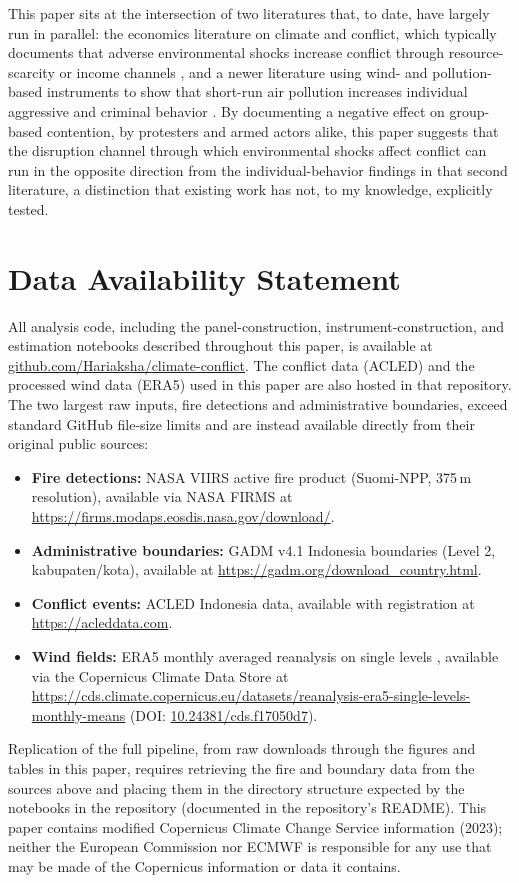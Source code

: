 \documentclass[12pt]{article}
\begin{document}
This paper sits at the intersection of two literatures that, to date, have largely run in parallel: the economics literature on climate and conflict, which typically documents that adverse environmental shocks increase conflict through resource-scarcity or income channels \citep{hsiang2013quantifying,burkehsiangmiguel2015}, and a newer literature using wind- and pollution-based instruments to show that short-run air pollution increases individual aggressive and criminal behavior \citep{herrnstadt2021,bondyrothsager2020,burkhardt2019}. By documenting a negative effect on group-based contention, by protesters and armed actors alike, this paper suggests that the disruption channel through which environmental shocks affect conflict can run in the opposite direction from the individual-behavior findings in that second literature, a distinction that existing work has not, to my knowledge, explicitly tested.

\section*{Data Availability Statement}

All analysis code, including the panel-construction, instrument-construction, and estimation notebooks described throughout this paper, is available at \href{https://github.com/Hariaksha/climate-conflict}{github.com/Hariaksha/climate-conflict}. The conflict data (ACLED) and the processed wind data (ERA5) used in this paper are also hosted in that repository. The two largest raw inputs, fire detections and administrative boundaries, exceed standard GitHub file-size limits and are instead available directly from their original public sources:
\begin{itemize}
    \item \textbf{Fire detections:} NASA VIIRS active fire product (Suomi-NPP, 375\,m resolution), available via NASA FIRMS at \url{https://firms.modaps.eosdis.nasa.gov/download/}.
    \item \textbf{Administrative boundaries:} GADM v4.1 Indonesia boundaries (Level 2, kabupaten/kota), available at \url{https://gadm.org/download_country.html}.
    \item \textbf{Conflict events:} ACLED Indonesia data, available with registration at \url{https://acleddata.com}.
    \item \textbf{Wind fields:} ERA5 monthly averaged reanalysis on single levels \citep{hersbach2023era5}, available via the Copernicus Climate Data Store at \url{https://cds.climate.copernicus.eu/datasets/reanalysis-era5-single-levels-monthly-means} (DOI: \href{https://doi.org/10.24381/cds.f17050d7}{10.24381/cds.f17050d7}).
\end{itemize}
Replication of the full pipeline, from raw downloads through the figures and tables in this paper, requires retrieving the fire and boundary data from the sources above and placing them in the directory structure expected by the notebooks in the repository (documented in the repository's README). This paper contains modified Copernicus Climate Change Service information (2023); neither the European Commission nor ECMWF is responsible for any use that may be made of the Copernicus information or data it contains.
\end{document}
